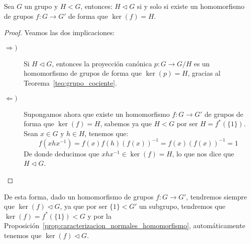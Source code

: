 \begin{prop}\label{prop:caracterizacion_normales_homomorfismo}
    Sea $G$ un grupo y $H<G$, entonces: $H\lhd G$ si y solo si existe un homomorfismo de grupos $f:G\to G'$ de forma que $\ker(f) = H$.
    \begin{proof}
        Veamos las dos implicaciones:
        \begin{description}
            \item [$\Longrightarrow)$] Si $H\lhd G$, entonces la proyección canónica $p:G\to G/H$ es un homomorfismo de grupos de forma que $\ker(p) = H$, gracias al Teorema~\ref{teo:grupo_cociente}.
            \item [$\Longleftarrow)$] Supongamos ahora que existe un homomorfismo $f:G\to G'$ de grupos de forma que $\ker(f) = H$, sabemos ya que $H<G$ por ser $H = f^\ast(\{1\})$. Sean $x\in G$ y $h\in H$, tenemos que:
                \begin{equation*}
                    f(xhx^{-1}) = f(x)f(h){(f(x))}^{-1} = f(x) {(f(x))}^{-1} = 1
                \end{equation*}
                De donde deducimos que $xhx^{-1}\in \ker(f) = H$, lo que nos dice que $H\lhd G$. \qedhere
        \end{description}
    \end{proof}
\end{prop}
\begin{observacion}
    De esta forma, dado un homomorfismo de grupos $f:G\to G'$, tendremos siempre que $\ker(f) \lhd G$, ya que por ser $\{1\}<G'$ un subgrupo, tendremos que $\ker(f)=f^\ast(\{1\}) < G$ y por la Proposición~\ref{prop:caracterizacion_normales_homomorfismo}, automáticamente tenemos que $\ker(f) \lhd G$.
\end{observacion}

